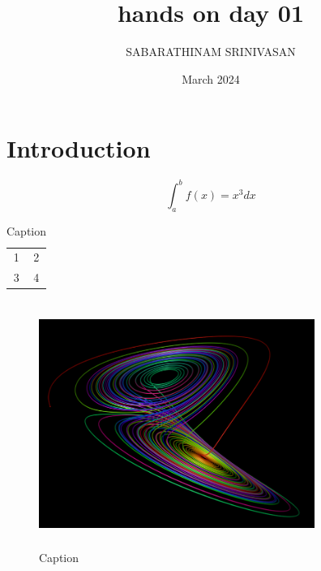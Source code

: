 \documentclass{article}
\title{hands on day 01}
\author{SABARATHINAM SRINIVASAN}
\date{March 2024}
\begin{document}
\maketitle

\section{Introduction}
\begin{equation}
    \int_a^b f(x)=x^3 dx
\end{equation}


\begin{table}[]
    \centering
    \begin{tabular}{c|c}
        1 &  2\\
       3  & 4
    \end{tabular}
    \caption{Caption}
    \label{tab:my_label}
\end{table}

\begin{figure}
    \centering
    \includegraphics[height=8cm,width=9cm]{lorenz3.png}
    \caption{Caption}
    \label{fig:enter-label}
\end{figure}
\end{document}
